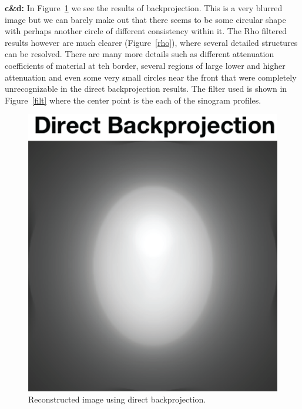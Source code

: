 \documentclass[12pt]{article}
\begin{document}
\noindent\textbf{c\&d: }
In Figure~\ref{direct} we see the results of backprojection. This is a very blurred image but we can barely make out that there seems to be some circular shape with perhaps another circle of different consistency within it. The Rho filtered results however are much clearer (Figure~\ref{rho}), where several detailed structures can be resolved. There are many more details such as different attenuation coefficients of material at teh border, several regions of large lower and higher attenuation and even some very small circles near the front that were completely unrecognizable in the direct backprojection results. The filter used is shown in Figure~\ref{filt} where the center point is the each of the sinogram profiles.
\begin{figure}[H]
	\includegraphics[width=\textwidth]{direct.png}
	\caption{Reconstructed image using direct backprojection.}
	\label{direct}
\end{figure}
\end{document}

